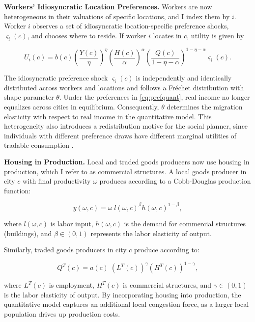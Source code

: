 \textbf{Workers’ Idiosyncratic Location Preferences.} Workers are now heterogeneous in their valuations of specific locations, and I index them by $i$. Worker $i$ observes a set of idiosyncratic location-specific preference shocks, $\varsigma_i(c)$, and chooses where to reside. If worker $i$ locates in $c$, utility is given by

\begin{equation}\label{eq:prefquant}
U_i(c) = b(c) \left(\frac{Y(c)}{\eta}\right)^{\eta} \left(\frac{H(c)}{\alpha}\right)^{\alpha} \left(\frac{Q(c)}{1-\eta-\alpha}\right)^{1-\eta-\alpha} \varsigma_i(c).
\end{equation}

The idiosyncratic preference shock $\varsigma_i(c)$ is independently and identically distributed across workers and locations and follows a Fréchet distribution with shape parameter $\theta$. Under the preferences in \eqref{eq:prefquant}, real income no longer equalizes across cities in equilibrium. Consequently, $\theta$ determines the migration elasticity with respect to real income in the quantitative model. This heterogeneity also introduces a redistribution motive for the social planner, since individuals with different preference draws have different marginal utilities of tradable consumption \parencite{Fajgelbaum&Gaubert20}.

\textbf{Housing in Production.} Local and traded goods producers now use housing in production, which I refer to as commercial structures. A local goods producer in city $c$ with final productivity $\omega$ produces according to a Cobb-Douglas production function:

\begin{equation}\label{eq:prodfntquant}
	y(\omega,c) = \omega \; l(\omega,c)^{\beta} h(\omega,c)^{1-\beta},
\end{equation}

where $l(\omega,c)$ is labor input, $h(\omega,c)$ is the demand for commercial structures (buildings), and $\beta \in (0,1)$ represents the labor elasticity of output. 

Similarly, traded goods producers in city $c$ produce according to:

\begin{equation}\label{eq:prodftquant}
	Q^T(c) = a(c) \; \left(L^T(c)\right)^{\gamma} \left(H^T(c)\right)^{1 - \gamma},
\end{equation}

where $L^T(c)$ is employment, $H^T(c)$ is commercial structures, and $\gamma \in (0,1)$ is the labor elasticity of output. By incorporating housing into production, the quantitative model captures an additional local congestion force, as a larger local population drives up production costs.

